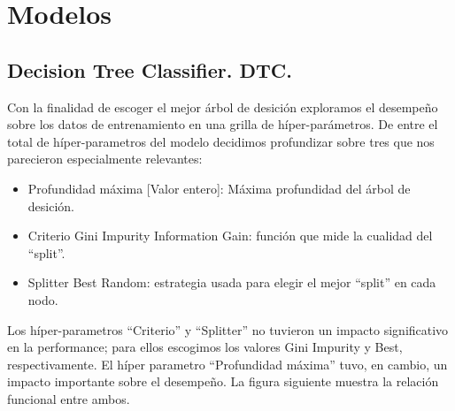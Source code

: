 \documentclass[a4paper,10pt]{article}
\begin{document}

\section{Modelos}

\subsection{Decision Tree Classifier. DTC.}

\par Con la finalidad de escoger el mejor árbol de desición exploramos 
el desempeño sobre los datos de entrenamiento en una grilla de híper-parámetros.
De entre el total de híper-parametros del modelo decidimos profundizar sobre 
tres que nos parecieron especialmente relevantes:
\begin{itemize}
 \item Profundidad máxima [Valor entero]: Máxima profundidad del árbol de desición. 
 \item Criterio Gini Impurity  Information Gain: función que mide la cualidad 
del ``split''. 
  \item Splitter Best  Random: estrategia usada para elegir el mejor 
``split'' en cada nodo.
\end{itemize}

Los híper-parametros ``Criterio'' y ``Splitter'' no tuvieron un impacto 
significativo en la performance; para ellos escogimos los valores Gini Impurity 
y Best, respectivamente.
El híper parametro ``Profundidad máxima'' tuvo, en cambio, un impacto 
importante sobre el desempeño. La figura siguiente muestra 
la relación funcional entre ambos.
\end{document}

